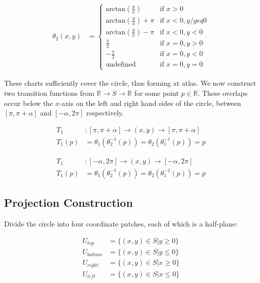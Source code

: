 \documentclass{article}
\newcommand{\lp}{\left(} %
\newcommand{\rp}{\right)} %
\begin{document}
        \begin{align*}
            \theta_2(x,y) &= 
            \begin{cases}
                \textrm{arctan}(\frac{y}{x}) & \textrm{if } x > 0 \\
                \textrm{arctan}(\frac{y}{x}) + \pi & \textrm{if } x < 0, y /geq 0 \\
                \textrm{arctan}(\frac{y}{x}) - \pi & \textrm{if } x < 0, y < 0 \\
                \frac{\pi}{2} & \textrm{if } x = 0, y > 0 \\
                -\frac{\pi}{2} & \textrm{if } x = 0, y < 0 \\
                \textrm{undefined} & \textrm{if } x = 0, y = 0
            \end{cases}
        \end{align*}

        These charts sufficiently cover the circle, thus forming at atlas. We now construct two transition functions from $\mathbb{R} \rightarrow S \rightarrow \mathbb{R}$ for some point $p \in \mathbb{R}$. These overlaps occur below the $x$-axis on the left and right hand sides of the circle, between $[\pi, \pi + \alpha]$ and $[-\alpha, 2 \pi]$ respectively.

        \begin{align*}
            T_1 &: [\pi, \pi + \alpha] \rightarrow (x,y) \rightarrow [\pi, \pi + \alpha] \\
            T_1(p) &= \theta_1 \lp \theta_2^{-1}(p) \rp = \theta_2 \lp \theta_1^{-1}(p) \rp = p
        \end{align*}

        \begin{align*}
            T_1 &: [-\alpha, 2 \pi] \rightarrow (x,y) \rightarrow [- \alpha, 2 \pi] \\
            T_1(p) &= \theta_1 \lp \theta_2^{-1}(p) \rp = \theta_2 \lp \theta_1^{-1}(p) \rp = p
        \end{align*}

    \subsection{Projection Construction}

        Divide the circle into four coordinate patches, each of which is a half-plane:

        \begin{align*}
            U_{top} &= \{(x,y) \in S | y \geq 0 \} \\
            U_{bottom} &= \{(x,y) \in S | y \leq 0 \} \\
            U_{right} &= \{(x,y) \in S | x \geq 0 \} \\
            U_{left} &= \{(x,y) \in S | x \leq 0 \} \\
        \end{align*}
\end{document}
